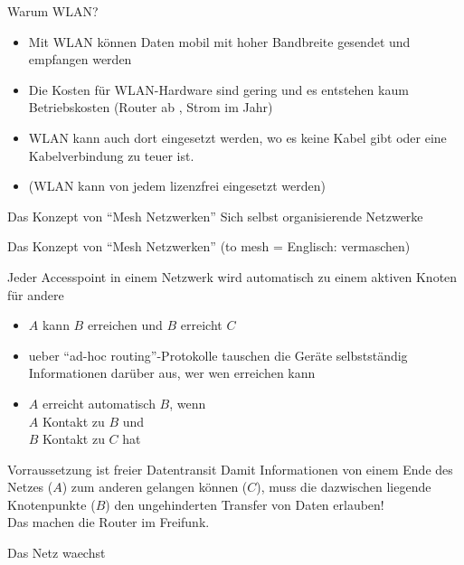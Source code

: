 \documentclass[aspectratio=43]{beamer}
\begin{document}
\begin{frame}{Warum WLAN?}
	\begin{itemize}
		\item Mit WLAN können Daten mobil mit hoher Bandbreite gesendet und empfangen werden
		\item Die Kosten für WLAN-Hardware sind gering und es entstehen kaum Betriebskosten (Router ab , Strom  im Jahr)
		\item WLAN kann auch dort eingesetzt werden, wo es keine Kabel gibt oder eine Kabelverbindung zu teuer ist. %
		\item (WLAN kann von jedem lizenzfrei eingesetzt werden) %
	\end{itemize}
\end{frame}

\begin{frame}{Das Konzept von ``Mesh Netzwerken''} %
	Sich selbst organisierende Netzwerke
\end{frame}

\begin{frame}{Das Konzept von ``Mesh Netzwerken''} %
	(to mesh = Englisch: vermaschen)

	Jeder Accesspoint in einem Netzwerk wird automatisch zu einem aktiven Knoten für andere
	\begin{itemize}
		\item $A$ kann $B$ erreichen und $B$ erreicht $C$
		\item ueber ``ad-hoc routing''-Protokolle tauschen die Geräte selbstständig Informationen darüber aus, wer wen erreichen kann
		\item $A$ erreicht automatisch $B$, wenn\\
		$A$ Kontakt zu $B$ und\\
		$B$ Kontakt zu $C$ hat
	\end{itemize}
\end{frame}

\begin{frame}{Vorraussetzung ist freier Datentransit} %
	Damit Informationen von einem Ende des Netzes ($A$) zum anderen gelangen können ($C$), muss die dazwischen liegende Knotenpunkte ($B$) den ungehinderten Transfer von Daten erlauben!\\
	Das machen die Router im Freifunk.
\end{frame}

\begin{frame}{Das Netz waechst}

\end{frame}
\end{document}
